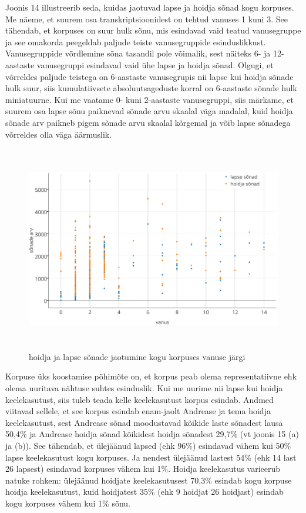 \documentclass[12pt]{article}
\begin{document}
Joonis 14 illustreerib seda, kuidas jaotuvad lapse ja hoidja sõnad kogu korpuses. Me näeme, et suurem osa transkriptsioonidest on tehtud vanuses 1 kuni 3. See tähendab, et
 korpuses on suur hulk sõnu, mis esindavad vaid teatud vanusegruppe ja see omakorda peegeldab paljude teiste vanusegruppide esinduslikkust. Vanusegruppide võrdlemine sõna tasandil pole võimalik, sest näiteks 6- ja 12-aastaste vanusegruppi esindavad vaid ühe lapse ja hoidja sõnad. Olgugi, et võrreldes paljude teistega on 6-aastaste vanusegrupis nii lapse kui hoidja sõnade hulk suur, siis kumulatiivsete absoluutsageduste korral on 6-aastaste sõnade hulk miniatuurne. Kui me vaatame 0- kuni 2-aastaste vanusegruppi, siis märkame, et suurem osa lapse sõnu paiknevad sõnade arvu skaalal väga madalal, kuid hoidja sõnade arv paikneb pigem sõnade arvu skaalal kõrgemal ja võib lapse sõnadega võrreldes olla väga äärmuslik.


\begin{figure}[H]
    \centering
    \includegraphics[width=\textwidth, height=9cm]{lindistused_vanus_sonad_crop}
    \caption{hoidja ja lapse sõnade jaotumine kogu korpuses vanuse järgi}
\end{figure}

Korpuse üks koostamise põhimõte on, et korpus peab olema representatiivne ehk olema uuritava nähtuse suhtes esinduslik. Kui me uurime nii lapse kui hoidja keelekasutust, siis tuleb teada kelle keelekasutust korpus esindab. Andmed viitavad sellele, et see korpus esindab enam-jaolt Andrease ja tema hoidja keelekasutust, sest Andrease sõnad moodustavad kõikide laste sõnadest lausa 50,4\% ja Andrease hoidja sõnad kõikidest hoidja sõnadest 29,7\% (vt joonis 15 (a) ja (b)). See tähendab, et ülejäänud lapsed (ehk 96\%) esindavad vähem kui 50\% lapse keelekasutust kogu korpuses. Ja nendest ülejäänud lastest 54\% (ehk 14 last 26 lapsest) esindavad korpuses vähem kui 1\%. Hoidja keelekasutus varieerub natuke rohkem: ülejäänud hoidjate keelekasutusest 70,3\% esindab kogu korpuse hoidja keelekasutust, kuid hoidjatest 35\% (ehk 9 hoidjat 26 hoidjast) esindab kogu korpuses vähem kui 1\% sõnu.
\end{document}
